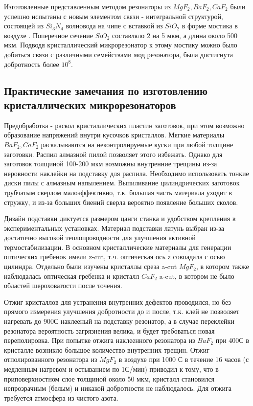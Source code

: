 Изготовленные представленным методом резонаторы из $MgF_2,BaF_2,CaF_2$ были успешно испытаны с новым элементом связи - интегральной структурой, состоящей из $Si_3N_4$ волновода на чипе с вставкой из $SiO_2$ в форме мостика в воздухе \cite{Anderson:18}. Поперечное сечение $SiO_2$ составляло 2 на 5 мкм, а длина около 500 мкм. Подводя кристаллический микрорезонатор к этому мостику можно было добиться связи с различными семействами мод резонатора, была достигнута добротность более $10^8$.

\subsection{Практические замечания по изготовлению кристаллических микрорезонаторов}

Предобработка - раскол кристаллических пластин заготовок, при этом возможно образование напряжений внутри кусочков кристаллов. Мягкие материалы $BaF_2, CaF_2$ раскалываются на неконтролируемые куски при любой толщине заготовки. Распил алмазной пилой позволяет этого избежать. Однако для заготовок толщиной 100-200 мкм возможны внутренние трещины из-за неровности наклейки на подставку для распила. Необходимо использовать тонкие диски пилы с алмазным напылением. Выпиливание цилиндрических заготовок трубчатым сверлом малоэффективно, т.к. большая часть материала уходит в стружку, и из-за больших биений сверла вероятно появление больших сколов.

Дизайн подставки диктуется размером цанги станка и удобством крепления в экспериментальных установках. Материал подставки латунь выбран из-за достаточно высокой теплопроводности для улучшения активной термостабилизации. В основном кристаллические материалы для генерации оптических гребенок имели z-cut, т.ч. оптическая ось z совпадала с осью цилиндра. Отдельно были изучены кристаллы среза a-cut $MgF_2$, в котором также наблюдалась оптическая гребенка и кристалл $CaF_2$ a-cut, в котором не было областей шероховатости после точения.

Отжиг кристаллов для устранения внутренних дефектов проводился, но без прямого измерения улучшения добротности до и после, т.к. клей не позволяет нагревать до 900С наклееный на подставку резонатор, а в случае переклейки резонатора вероятность загрязнения велика, и будет требоваться новая переполировка. При попытке отжига наклеенного резонатора из $BaF_2$ при 400С в кристалле возникло большое количество внутренних трещин. Отжиг отполированного резонатора из $MgF_2$ в воздухе при 1000 С в течение 16 часов (с медленным нагревом и остыванием по 1С/мин) приводил к тому, что в приповерхностном слое толщиной около 50 мкм, кристалл становился непрозрачным (белым) и никакой добротности не наблюдалось. Для отжига требуется атмосфера из чистого азота.

